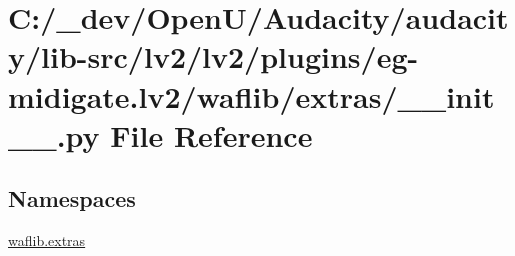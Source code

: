 \hypertarget{lv2_2lv2_2plugins_2eg-midigate_8lv2_2waflib_2extras_2____init_____8py}{}\section{C\+:/\+\_\+dev/\+Open\+U/\+Audacity/audacity/lib-\/src/lv2/lv2/plugins/eg-\/midigate.lv2/waflib/extras/\+\_\+\+\_\+init\+\_\+\+\_\+.py File Reference}
\label{lv2_2lv2_2plugins_2eg-midigate_8lv2_2waflib_2extras_2____init_____8py}
\subsection*{Namespaces}
\begin{DoxyCompactItemize}
\item 
 \hyperlink{namespacewaflib_1_1extras}{waflib.\+extras}
\end{DoxyCompactItemize}
